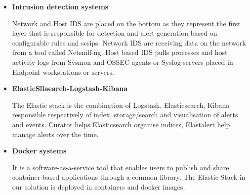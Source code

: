\begin{itemize}
    \item\textbf{Intrusion detection systems } 
    
    Network and Host IDS are placed on the bottom as they represent the first layer that is responsible for detection and alert generation based on configurable rules and scrips. Network IDS are receiving data on the network from a tool called Netsniff-ng, Host based IDS pulls processes and host activity logs from Sysmon and OSSEC agents or Syslog servers placed in Endpoint workstations or servers.
    \item\textbf{ElasticSllaearch-Logstash-Kibana }
    
    The Elastic stack is the combination of Logstash, Elasticsearch, Kibana responsible respectively of index, storage/search and visualisation of alerts and events. Curator helps Elasticsearch organise indices, Elastalert help manage alerts over the time.
    \item\textbf{Docker systems }
    
    It is a software-as-a-service tool that enables users to publish and share container-based applications through a common library. The Elastic Stack in our solution is deployed in containers and docker images.
\end{itemize} 
